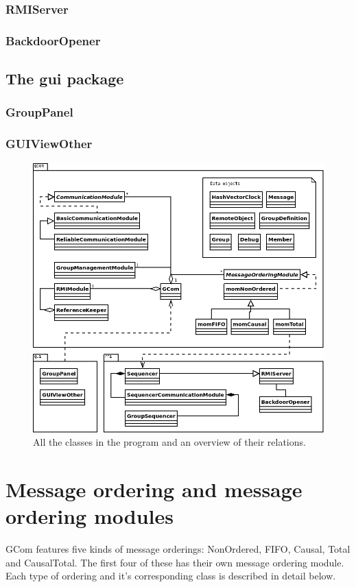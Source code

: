 \documentclass[english]{article}
\begin{document}
\subsubsection{RMIServer}
\subsubsection{BackdoorOpener}

\subsection{The gui package}
\subsubsection{GroupPanel}
\subsubsection{GUIViewOther}


\begin{figure}
\includegraphics[width=\textwidth]{superuml.png}
\caption{All the classes in the program and an overview of their relations.}
\label{fig:overview}
\end{figure}

\section{Message ordering and message ordering modules}
\label{messageordering}
GCom features five kinds of message orderings: NonOrdered, FIFO, Causal, Total and CausalTotal. The first four of these has their own message ordering module. Each type of ordering and it's corresponding class is described in detail below.
\end{document}
